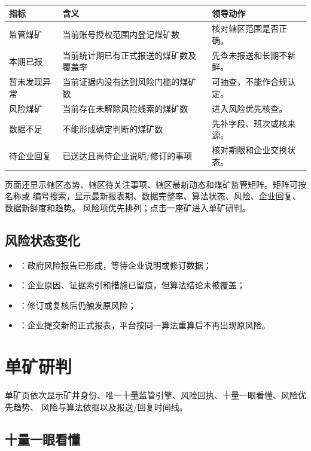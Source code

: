 \documentclass[UTF8,openany,zihao=-4,fontset=none]{ctexbook}
\begin{document}
\begin{longtable}{P{36mm}P{64mm}P{44mm}}
\toprule
\textbf{指标} & \textbf{含义} & \textbf{领导动作}\\
\midrule
监管煤矿 & 当前账号授权范围内登记煤矿数 & 核对辖区范围是否正确。\\
本期已报 & 当前统计期已有正式报送的煤矿数及覆盖率 & 先查未报送和长期不新鲜。\\
暂未发现异常 & 当前证据内没有达到风险门槛的煤矿数 & 可抽查，不能作合规认定。\\
风险煤矿 & 当前存在未解除风险线索的煤矿数 & 进入风险优先核查。\\
数据不足 & 不能形成确定判断的煤矿数 & 先补字段、班次或核来源。\\
待企业回复 & 已送达且尚待企业说明/修订的事项 & 核对期限和企业交换状态。\\
\bottomrule
\end{longtable}

页面还显示辖区态势、辖区待关注事项、辖区最新动态和煤矿监管矩阵。矩阵可按名称或
编号搜索，显示最新报表期、数据完整率、算法状态、风险、企业回复、数据新鲜度和趋势。
风险项优先排列；点击一座矿进入单矿研判。

\subsection{风险状态变化}

\begin{itemize}
  \item {}：政府风险报告已形成，等待企业说明或修订数据；
  \item {}：企业原因、证据索引和措施已留痕，但算法结论未被覆盖；
  \item {}：修订或复核后仍触发原风险；
  \item {}：企业提交新的正式报表，平台按同一算法重算后不再出现原风险。
\end{itemize}

\section{单矿研判}

单矿页依次显示矿井身份、唯一十量监管引擎、风险回执、十量一眼看懂、风险优先趋势、
风险与算法依据以及报送/回复时间线。

\subsection{十量一眼看懂}
\end{document}
